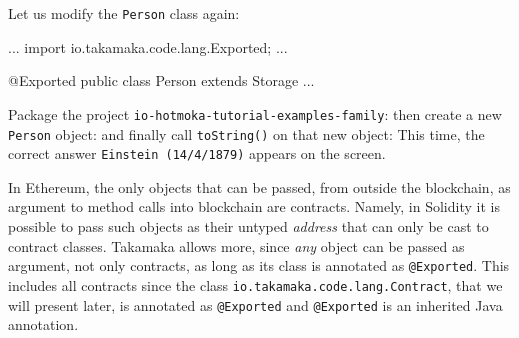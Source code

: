 Let us modify the \texttt{Person} class again:
%
\begin{codebox}\begin{javalst}
...
import io.takamaka.code.lang.Exported;
...

@Exported
public class Person extends Storage {
  ...
}
\end{javalst}\end{codebox}
%
Package the project \texttt{io-hotmoka-tutorial-examples-family}:
%
%
then create a new \texttt{Person} object:
%
%
and finally call \texttt{toString()} on that new object:
%
%
This time, the correct answer \texttt{Einstein (14/4/1879)} appears on the screen.
%
\begin{commentbox}
In Ethereum, the only objects that can be passed, from outside the blockchain,
as argument to method calls into blockchain are contracts. Namely, in Solidity
it is possible to pass such objects as their untyped \emph{address} that can only
be cast to contract classes. Takamaka allows more, since \emph{any} object can be passed as
argument, not only contracts, as long as its class is annotated as \texttt{@Exported}.
This includes all contracts since the class
\texttt{io.takamaka.code.lang.Contract}, that
we will present later, is annotated as \texttt{@Exported} and \texttt{@Exported} is an
inherited Java annotation.
\end{commentbox}

